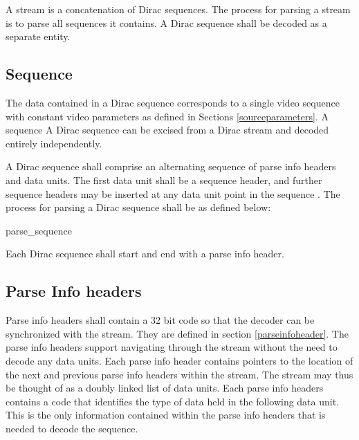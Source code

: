 A stream is a concatenation of Dirac sequences. The process for parsing a stream 
is to parse all sequences it contains. A Dirac sequence shall be decoded as a separate entity.

\subsection{Sequence}

The data contained in a Dirac sequence corresponds to a single video sequence with
constant video parameters as defined in Sections \ref{sourceparameters}. A sequence
 A Dirac sequence can be excised from a Dirac stream and decoded entirely
independently.

A Dirac sequence shall comprise an alternating sequence of parse info headers and 
data units. The first data unit shall be a sequence header, and further sequence 
headers may be inserted at any data unit point in the sequence . 
The process for parsing a Dirac sequence shall be as defined below:

\begin{pseudo}{parse\_sequence}{}
\bsCODE{\StateName=\{\}}
\bsCODE{\RefBuffer=\{\}}
    \bsEND
\bsEND
\end{pseudo}

Each Dirac sequence shall start and end with a parse info header. 

\subsection{Parse Info headers}

Parse info headers shall contain a 32 bit code so that the decoder can 
be synchronized with the stream. They are defined in section \ref{parseinfoheader}.
The parse info headers support navigating through the stream without the 
need to decode any data units. Each parse info header contains pointers 
to the location of the next and previous parse info headers within the stream. 
The stream may thus be thought of as a doubly linked list of data units.
Each parse info headers contains a code that identifies the type of data held 
in the following data unit. This is the only information contained within
the parse info headers that is needed to decode the sequence.

